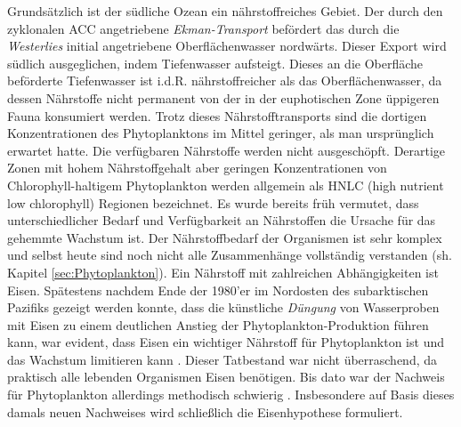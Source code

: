 \documentclass[12pt,a4paper,onecolumn]{scrartcl}
\begin{document}
Grundsätzlich ist der südliche Ozean ein nährstoffreiches Gebiet. Der durch den zyklonalen ACC angetriebene \textit{Ekman-Transport} befördert das durch die \textit{Westerlies} initial angetriebene Oberflächenwasser nordwärts. Dieser Export wird südlich ausgeglichen, indem Tiefenwasser aufsteigt. Dieses an die Oberfläche beförderte Tiefenwasser ist i.d.R. nährstoffreicher als das Oberflächenwasser, da dessen Nährstoffe nicht permanent von der in der euphotischen Zone üppigeren Fauna konsumiert werden. Trotz dieses Nährstofftransports sind die dortigen Konzentrationen des Phytoplanktons im Mittel geringer, als man ursprünglich erwartet hatte. Die verfügbaren Nährstoffe werden nicht ausgeschöpft. Derartige Zonen mit hohem Nährstoffgehalt aber geringen Konzentrationen von Chlorophyll-haltigem Phytoplankton werden allgemein als HNLC (high nutrient low chlorophyll) Regionen bezeichnet. Es wurde bereits früh vermutet, dass unterschiedlicher Bedarf und Verfügbarkeit an Nährstoffen die Ursache für das gehemmte Wachstum ist. Der Nährstoffbedarf der Organismen ist sehr komplex und selbst heute sind noch nicht alle Zusammenhänge vollständig verstanden (sh. Kapitel \ref{sec:Phytoplankton}). Ein Nährstoff mit zahlreichen Abhängigkeiten ist Eisen. Spätestens nachdem Ende der 1980'er im Nordosten des subarktischen Pazifiks gezeigt werden konnte, dass die künstliche \textit{Düngung} von Wasserproben mit Eisen zu einem deutlichen Anstieg der Phytoplankton-Produktion führen kann, war evident, dass Eisen ein wichtiger Nährstoff für Phytoplankton ist und das Wachstum limitieren kann \citep{Martin.1988}. Dieser Tatbestand war nicht überraschend, da praktisch alle lebenden Organismen Eisen benötigen. Bis dato war der Nachweis für Phytoplankton allerdings methodisch schwierig \citep{Martin.1988}. Insbesondere auf Basis dieses damals neuen Nachweises wird schließlich die Eisenhypothese formuliert. \\
\end{document}
